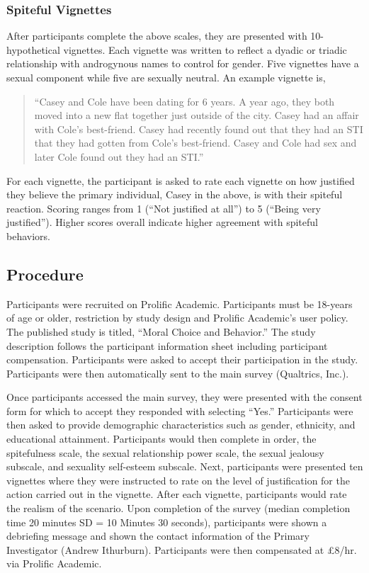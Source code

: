 \documentclass[
  english,
  a4paper]{apa7}
\begin{document}
\hypertarget{spiteful-vignettes}{%
\subsubsection{Spiteful Vignettes}\label{spiteful-vignettes}}

After participants complete the above scales, they are presented with 10-hypothetical vignettes. Each vignette was written to reflect a dyadic or triadic relationship with androgynous names to control for gender. Five vignettes have a sexual component while five are sexually neutral. An example vignette is,

\begin{quote}
``Casey and Cole have been dating for 6 years. A year ago, they both moved into a new flat together just outside of the city. Casey had an affair with Cole's best-friend. Casey had recently found out that they had an STI that they had gotten from Cole's best-friend. Casey and Cole had sex and later Cole found out they had an STI.''
\end{quote}

For each vignette, the participant is asked to rate each vignette on how justified they believe the primary individual, Casey in the above, is with their spiteful reaction. Scoring ranges from 1 (``Not justified at all'') to 5 (``Being very justified''). Higher scores overall indicate higher agreement with spiteful behaviors.

\hypertarget{procedure}{%
\subsection{Procedure}\label{procedure}}

Participants were recruited on Prolific Academic. Participants must be 18-years of age or older, restriction by study design and Prolific Academic's user policy. The published study is titled, ``Moral Choice and Behavior.'' The study description follows the participant information sheet including participant compensation. Participants were asked to accept their participation in the study. Participants were then automatically sent to the main survey (Qualtrics, Inc.).

Once participants accessed the main survey, they were presented with the consent form for which to accept they responded with selecting ``Yes.'' Participants were then asked to provide demographic characteristics such as gender, ethnicity, and educational attainment. Participants would then complete in order, the spitefulness scale, the sexual relationship power scale, the sexual jealousy subscale, and sexuality self-esteem subscale. Next, participants were presented ten vignettes where they were instructed to rate on the level of justification for the action carried out in the vignette. After each vignette, participants would rate the realism of the scenario. Upon completion of the survey (median completion time 20 minutes SD = 10 Minutes 30 seconds), participants were shown a debriefing message and shown the contact information of the Primary Investigator (Andrew Ithurburn). Participants were then compensated at £8/hr. via Prolific Academic.
\end{document}
